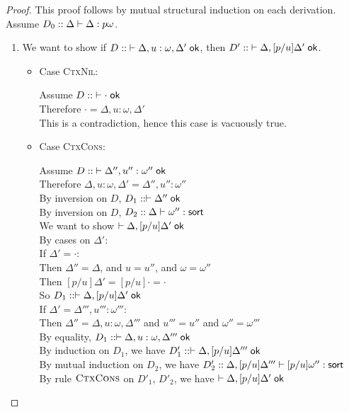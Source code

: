 \begin{proof}
This proof follows by mutual structural induction on each derivation. 
Assume $D_0 :: \judgeA{\Delta}{p}{\omega}$. 

\begin{enumerate}
\item We want to show if $D  ::\; \judgeACtx{\Delta, u:\omega, \Delta'}$, then  
                         $D' ::\; \judgeACtx{\Delta, [p/u]\Delta'}$. 
  \begin{itemize}
  \item Case \textsc{CtxNil}: 
    \begin{tabbedproof}
      \oo Assume $D ::\; \judgeACtx{\cdot}$ \\
      \ooo Therefore $\cdot = \Delta, u:\omega, \Delta'$ \\
      \ooo This is a contradiction, hence this case is vacuously true. 
    \end{tabbedproof}

  \item Case \textsc{CtxCons}: 
    \begin{tabbedproof}
      \oo Assume $D ::\; \judgeACtx{\Delta'', u'':\omega''}$ \\
      \ooo Therefore $\Delta, u:\omega, \Delta' = \Delta'', u'':\omega''$ \\
      \ooo By inversion on $D$, $D_1 :: \judgeACtx{\Delta''}$ \\
      \ooo By inversion on $D$, $D_2 :: \judgeSort{\omega''}$ \\
      \ooo We want to show $\judgeACtx{\Delta, [p/u]\Delta'}$ \\
      \ooo By cases on $\Delta'$: \\
      \oooo If $\Delta' = \cdot$: \\
      \ooooo Then $\Delta'' = \Delta$, and $u = u''$, and $\omega = \omega''$ \\
      \ooooo Then $[p/u]\Delta' = [p/u]\cdot = \cdot$ \\
      \ooooo So $D_1 :: \judgeACtx{\Delta, [p/u]\Delta'}$ \\
      \oooo If $\Delta' = \Delta''', u''':\omega'''$:\\
      \ooooo Then $\Delta'' = \Delta, u:\omega, \Delta'''$ and $u''' = u''$ and $\omega'' = \omega'''$ \\ 
      \ooooo By equality, $D_1 :: \judgeACtx{\Delta, u:\omega, \Delta'''}$ \\
      \ooooo By induction on $D_1$, we have $D'_1 :: \judgeACtx{\Delta, [p/u]\Delta'''}$ \\ 
      \ooooo By mutual induction on $D_2$, we have 
                 $D'_2 :: \judgeSort[{\Delta, [p/u]\Delta'''}]{[p/u]\omega''}$ \\ 
      \ooooo By rule $\textsc{CtxCons}$ on $D'_1$, $D'_2$, we have 
                 $\judgeACtx{\Delta, [p/u]\Delta'}$ \\
    \end{tabbedproof}
  \end{itemize}


\end{enumerate}
\end{proof}
